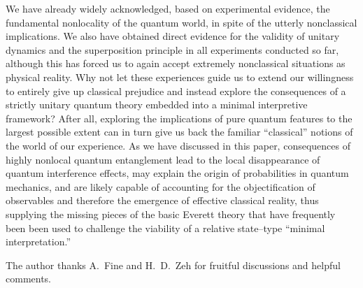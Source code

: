 \documentclass[12pt,aps,floatfix,amsmath,amssymb,showpacs,nofootinbib]{revtex4-2}
\begin{document}
We have already widely acknowledged, based on experimental evidence,
the fundamental nonlocality of the quantum world, in spite of the
utterly nonclassical implications. We also have obtained direct
evidence for the validity of unitary dynamics and the superposition
principle in all experiments conducted so far, although this has
forced us to again accept extremely nonclassical situations as
physical reality. Why not let these experiences guide us to extend our
willingness to entirely give up classical prejudice and instead
explore the consequences of a strictly unitary quantum theory embedded
into a minimal interpretive framework?  After all, exploring the
implications of pure quantum features to the largest possible extent
can in turn give us back the familiar ``classical'' notions of the
world of our experience. As we have discussed in this paper,
consequences of highly nonlocal quantum entanglement lead to the local
disappearance of quantum interference effects, may explain the origin
of probabilities in quantum mechanics, and are likely capable of
accounting for the objectification of observables and therefore the
emergence of effective classical reality, thus supplying the missing
pieces of the basic Everett theory that have frequently been been used
to challenge the viability of a relative state--type ``minimal
interpretation.''



\begin{acknowledgements}
  
The author thanks A.\ Fine and H.\ D.\ Zeh for fruitful
discussions and helpful comments.

\end{acknowledgements}


\end{document}
